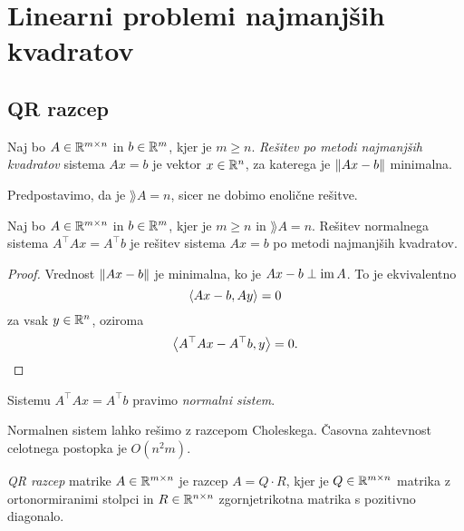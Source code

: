 \section{Linearni problemi najmanjših kvadratov}

\subsection{QR razcep}

\begin{definicija}
Naj bo $A \in \mathbb{R}^{m \times n}$ in $b \in \mathbb{R}^m$, kjer je $m \geq n$.
\emph{Rešitev po metodi najmanjših kvadratov}
sistema $Ax = b$ je vektor $x \in \mathbb{R}^n$, za katerega je
$\left\lVert Ax - b\right\rVert$ minimalna.
\end{definicija}

\begin{opomba}
Predpostavimo, da je $\rang A = n$, sicer ne dobimo enolične
rešitve.
\end{opomba}

\begin{izrek}
Naj bo $A \in \mathbb{R}^{m \times n}$ in $b \in \mathbb{R}^m$, kjer je $m \geq n$
in $\rang A = n$. Rešitev normalnega sistema
$A^\top A x = A^\top b$ je rešitev sistema $Ax = b$ po metodi
najmanjših kvadratov.
\end{izrek}

\begin{proof}
Vrednost $\left\lVert Ax - b\right\rVert$ je minimalna, ko je $Ax - b \perp \operatorname{im} A$.
To je ekvivalentno
\[
\left\langle Ax - b, Ay\right\rangle = 0
\]
za vsak $y \in \mathbb{R}^n$, oziroma
\[
\left\langle A^\top Ax - A^\top b, y\right\rangle = 0. \qedhere
\]
\end{proof}

\begin{opomba}
Sistemu $A^\top Ax = A^\top b$ pravimo \emph{normalni sistem}.
\end{opomba}

\begin{opomba}
Normalnen sistem lahko rešimo z razcepom Choleskega. Časovna
zahtevnost celotnega postopka je $O(n^2 m)$.
\end{opomba}

\begin{definicija}
\emph{QR razcep} matrike
$A \in \mathbb{R}^{m \times n}$ je razcep $A = Q \cdot R$, kjer je
$Q \in \mathbb{R}^{m \times n}$ matrika z ortonormiranimi stolpci in
$R \in \mathbb{R}^{n \times n}$ zgornjetrikotna matrika s pozitivno
diagonalo.
\end{definicija}


